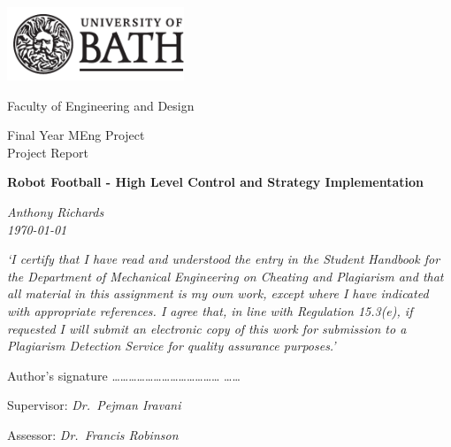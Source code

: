 \begin{titlepage}
  \setlength{\parindent}{0cm}

  \includegraphics[width=200px]{Images/uob-logo-black-transparent}

  \Large
  Faculty of Engineering and Design

  \vspace{20pt}

  \begin{singlespace}
  \LARGE
  Final Year MEng Project \\
  Project Report
  \end{singlespace}

  \vspace{40pt}
  \textbf{Robot Football - High Level Control and Strategy Implementation}

  \vspace{10pt}
  \emph{Anthony Richards} \\
  \emph{\today}
  
  \vspace{20pt}
  \begin{singlespace}
  \emph{ \large
  `I certify that I have read and understood the entry in the Student Handbook
  for the Department of Mechanical Engineering on Cheating and Plagiarism and
  that all material in this assignment is my own work, except where I have
  indicated with appropriate references. I agree that, in line with Regulation
  15.3(e), if requested I will submit an electronic copy of this work for
  submission to a Plagiarism Detection Service for quality assurance purposes.'
 }
  \end{singlespace}
  
  \vspace{20pt}
  
  {\large
  Author's signature
  \ldots\ldots\ldots\ldots\ldots\ldots\ldots\ldots\ldots\ldots\ldots\ldots\ldots
  \ldots\ldots
  }

  \vspace{80pt}
  Supervisor: \emph{Dr.~Pejman Iravani}

  \vspace{10pt}
  Assessor: \emph{Dr.~Francis Robinson}
\end{titlepage}

